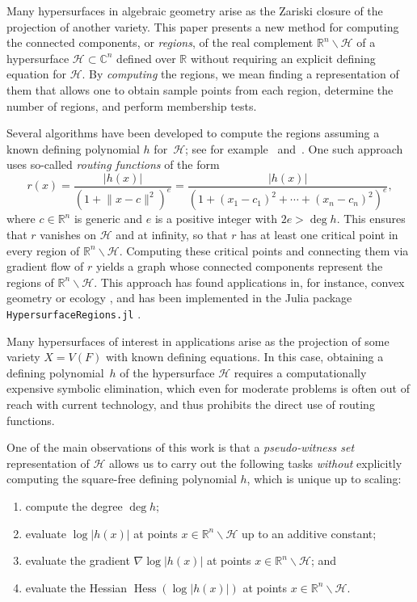 \documentclass[11pt]{article}
\numberwithin{equation}{section}
\theoremstyle{plain}
\theoremstyle{definition}
\theoremstyle{remark}
\newcommand{\sH}{{\mathcal H}}
\newcommand\bC{{\mathbb C}}
\newcommand\bR{{\mathbb R}}
\DeclareMathOperator*{\Hess}{Hess}
\begin{document}
Many hypersurfaces in algebraic geometry arise as the Zariski closure of the projection of another variety. 
This paper presents a new method for computing the connected components, or \emph{regions}, of the real complement $\bR^n\smallsetminus\sH$ of a hypersurface $\sH\subset\bC^n$ defined over $\bR$ without requiring an explicit defining
equation for $\sH$. 
By \textit{computing} the regions, we mean finding a representation of them that allows one to obtain sample points from each region, determine the number of regions, and perform membership tests.

Several algorithms have been developed to compute the regions assuming a known defining polynomial $h$ for~$\sH $; see for example~\cite[Section 15]{BasuPollackRoyBook} and~\cite{CannyRoadmaps,SafeySchost03}. One such approach~\cite{HypersurfaceRegions, SmoothConnectivity,HongConnectivity,HRSS} uses so-called \emph{routing functions} of the form
\begin{equation}\label{eq:Routing}
r(x) = \frac{\vert h(x)\vert }{(1+\lVert x-c\rVert^{2})^{e}} = \frac{\vert h(x)\vert }{(1+(x_{1}-c_{1})^{2}+\cdots+(x_{n}-c_{n})^{2})^{e}},
\end{equation}
where $c\in \bR^{n}$ is generic and $e$ is a positive integer with $2e > \deg h$. This ensures that $r$ vanishes on $\sH$ and at infinity, so that $r$ has at least one critical point in every region of $\bR^n\smallsetminus\sH$. Computing these critical points and connecting them via gradient flow of $r$ yields a graph whose connected components represent the regions of $\bR^n\smallsetminus\sH$. This approach has found applications in, for instance, convex geometry \cite{BrandenburgMeroni2025} or ecology \cite{CummingsDahlinGrossHauenstein2025,CelikHaasScholtenWangZucal2025}, and has been implemented in the Julia package \texttt{HypersurfaceRegions.jl} \cite{HypersurfaceRegions}.

Many hypersurfaces of interest in applications arise as the projection of some variety $X=V(F)$ with known defining equations. In this case, obtaining a defining polynomial~$h$ of the hypersurface $\sH$ requires a computationally expensive symbolic elimination, which even for moderate problems is often out of reach with current technology, and thus prohibits the direct use of routing functions. 

One of the main observations of this work is that a \emph{pseudo-witness set} representation \cite{WitnessSetsOfProj} of $\sH$ allows us to carry out the following tasks \emph{without} explicitly computing the square-free defining polynomial $h$, which is unique up to scaling:
\begin{enumerate}[label=(\arabic*)]
\item compute the degree $\deg h$;
\item evaluate $\log \lvert h(x)\rvert$ at points $x\in\mathbb R^n\smallsetminus\sH$ up to an additive constant;
\item evaluate the gradient $\nabla \log \lvert h(x)\rvert$ at points $x\in\mathbb R^n \smallsetminus \sH$; and
\item evaluate the Hessian $\Hess(\log \lvert h(x)\rvert)$ at points $x\in\mathbb R^n \smallsetminus \sH$.
\end{enumerate}
\end{document}
